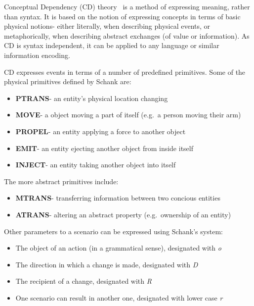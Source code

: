 
% 

    Conceptual Dependency (CD) theory~\cite{SCHANK1972552} is a method of expressing meaning, rather than syntax. It is based on the notion of expressing concepts in terms of basic physical notions- either literally, when describing physical events, or metaphorically, when describing abstract exchanges (of value or information). As CD is syntax independent, it can be applied to any language or similar information encoding.

    CD expresses events in terms of a number of predefined primitives. Some of the physical primitives defined by Schank are:
    \begin{itemize}
        \item \textbf{PTRANS}- an entity's physical location changing
        \item \textbf{MOVE}- a object moving a part of itself (e.g.~a person moving their arm)
        \item \textbf{PROPEL}- an entity applying a force to another object
        \item \textbf{EMIT}- an entity ejecting another object from inside itself
        \item \textbf{INJECT}- an entity taking another object into itself
    \end{itemize}

    The more abstract primitives include:
    \begin{itemize}
        \item \textbf{MTRANS}- transferring information between two concious entities
        \item \textbf{ATRANS}- altering an abstract property (e.g.~ownership of an entity)
    \end{itemize}

    Other parameters to a scenario can be expressed using Schank's system:
    \begin{itemize}
        \item The object of an action (in a grammatical sense), designated with \emph{o}
        \item The direction in which a change is made, designated with \emph{D}
        \item The recipient of a change, designated with \emph{R}
        \item One scenario can result in another one, designated with lower case \emph{r}
    \end{itemize}

